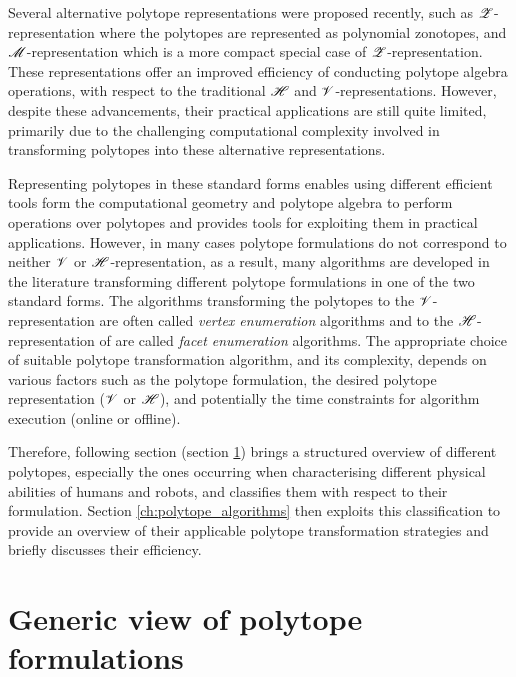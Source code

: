 Several alternative polytope representations were proposed recently, such as $\mathscr{Z}$-representation \cite{kochdumper2019representation} where the polytopes are represented as polynomial zonotopes, and $\mathscr{M}$-representation \cite{sigl2023mrepresentation} which is a more compact special case of $\mathscr{Z}$-representation. These representations offer an improved efficiency of conducting polytope algebra operations, with respect to the traditional $\mathscr{H}$ and $\mathscr{V}$-representations. However, despite these advancements, their practical applications are still quite limited, primarily due to the challenging computational complexity involved in transforming polytopes into these alternative representations. 

Representing polytopes in these standard forms enables using different efficient tools form the computational geometry and polytope algebra to perform operations over polytopes and provides tools for exploiting them in practical applications. However, in many cases polytope formulations do not correspond to neither $\mathscr{V}$ or $\mathscr{H}$-representation, as a result, many algorithms are developed in the literature transforming different polytope formulations in one of the two standard forms. The algorithms transforming the polytopes to the $\mathscr{V}$-representation are often called \textit{vertex enumeration} algorithms and to the $\mathscr{H}$-representation of are called \textit{facet enumeration} algorithms\cite{bremner_fukuda_marzetta_1998}. The appropriate choice of suitable polytope transformation algorithm, and its complexity, depends on various factors such as the polytope formulation, the desired polytope representation ($\mathscr{V}$ or $\mathscr{H}$), and potentially the time constraints for algorithm execution (online or offline). 

Therefore, following section (section \ref{ch:generic_view}) brings a structured overview of different polytopes, especially the ones occurring when characterising different physical abilities of humans and robots, and classifies them with respect to their formulation. Section \ref{ch:polytope_algorithms} then exploits this classification to provide an overview of their applicable polytope transformation strategies and briefly discusses their efficiency.

\section{Generic view of polytope formulations}
\label{ch:generic_view}

